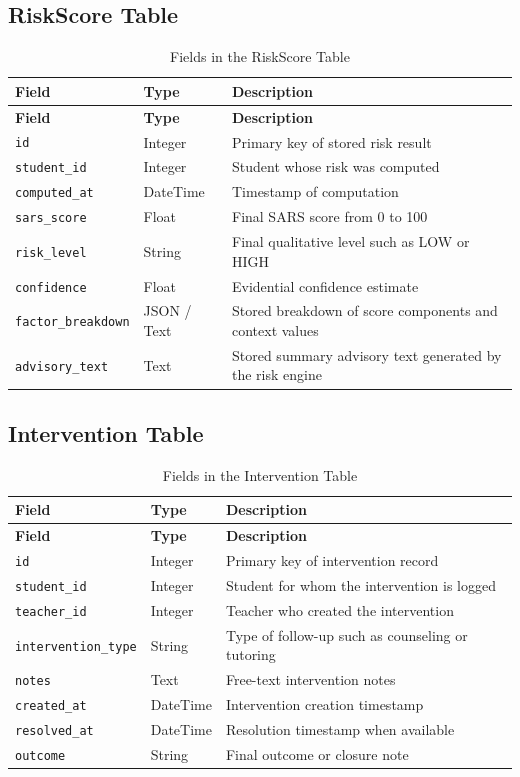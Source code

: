 \subsection{RiskScore Table}
\begin{longtable}{p{}p{}p{}}
\caption{Fields in the RiskScore Table}\\
\toprule
\textbf{Field} & \textbf{Type} & \textbf{Description} \\
\midrule
\endfirsthead
\toprule
\textbf{Field} & \textbf{Type} & \textbf{Description} \\
\midrule
\endhead
\texttt{id} & Integer & Primary key of stored risk result \\
\texttt{student\_id} & Integer & Student whose risk was computed \\
\texttt{computed\_at} & DateTime & Timestamp of computation \\
\texttt{sars\_score} & Float & Final SARS score from 0 to 100 \\
\texttt{risk\_level} & String & Final qualitative level such as LOW or HIGH \\
\texttt{confidence} & Float & Evidential confidence estimate \\
\texttt{factor\_breakdown} & JSON / Text & Stored breakdown of score components and context values \\
\texttt{advisory\_text} & Text & Stored summary advisory text generated by the risk engine \\
\bottomrule
\end{longtable}

\subsection{Intervention Table}
\begin{longtable}{p{}p{}p{}}
\caption{Fields in the Intervention Table}\\
\toprule
\textbf{Field} & \textbf{Type} & \textbf{Description} \\
\midrule
\endfirsthead
\toprule
\textbf{Field} & \textbf{Type} & \textbf{Description} \\
\midrule
\endhead
\texttt{id} & Integer & Primary key of intervention record \\
\texttt{student\_id} & Integer & Student for whom the intervention is logged \\
\texttt{teacher\_id} & Integer & Teacher who created the intervention \\
\texttt{intervention\_type} & String & Type of follow-up such as counseling or tutoring \\
\texttt{notes} & Text & Free-text intervention notes \\
\texttt{created\_at} & DateTime & Intervention creation timestamp \\
\texttt{resolved\_at} & DateTime & Resolution timestamp when available \\
\texttt{outcome} & String & Final outcome or closure note \\
\bottomrule
\end{longtable}

